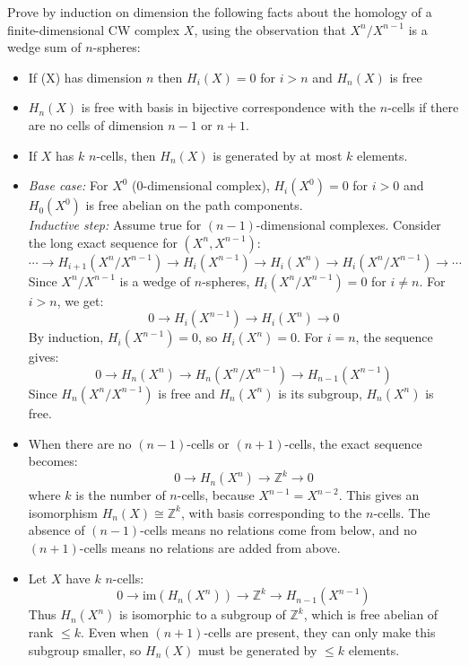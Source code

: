 \documentclass[12pt]{article}
\begin{document}
\begin{statement}
    Prove by induction on dimension the following facts about the homology of a finite-dimensional CW complex $X$, using the observation that $X^n/X^{n-1}$ is a wedge sum of $n$-spheres:
    \begin{itemize}
        \item If (X) has dimension $n$ then $H_i(X)=0$ for $i > n$ and $H_n(X)$ is free 
        \item $H_n(X)$ is free with basis in bijective correspondence with the $n$-cells if there are no cells of dimension $n-1$ or $n+1$.
        \item If $X$ has $k$ $n$-cells, then $H_n(X)$ is generated by at most $k$ elements.
    \end{itemize}
\end{statement}
\begin{newproof}
    \begin{itemize}
        \item \textit{Base case:} For $X^0$ (0-dimensional complex), $H_i(X^0) = 0$ for $i > 0$ and $H_0(X^0)$ is free abelian on the path        components. \\
        \textit{Inductive step:} Assume true for $(n-1)$-dimensional complexes. Consider the long exact sequence for $(X^n, X^{n-1})$:
            $$\cdots \to H_{i+1}(X^n/X^{n-1}) \to H_i(X^{n-1}) \to H_i(X^n) \to H_i(X^n/X^{n-1}) \to \cdots$$
            Since $X^n/X^{n-1}$ is a wedge of $n$-spheres, $H_i(X^n/X^{n-1}) = 0$ for $i \neq n$. For $i > n$, we get:
            $$0 \to H_i(X^{n-1}) \to H_i(X^n) \to 0$$
            By induction, $H_i(X^{n-1}) = 0$, so $H_i(X^n) = 0$. For $i = n$, the sequence gives:
            $$0 \to H_n(X^n) \to H_n(X^n/X^{n-1}) \to H_{n-1}(X^{n-1})$$
            Since $H_n(X^n/X^{n-1})$ is free and $H_n(X^n)$ is its subgroup, $H_n(X^n)$ is free.
            
        \item When there are no $(n-1)$-cells or $(n+1)$-cells, the exact sequence becomes:
            $$0 \to H_n(X^n) \to \mathbb{Z}^k \to 0$$
            where $k$ is the number of $n$-cells, because $X^{n-1}=X^{n-2}$. This gives an isomorphism $H_n(X) \cong \mathbb{Z}^k$, with basis corresponding to the $n$-cells. The absence of $(n-1)$-cells means no relations come from below, and no $(n+1)$-cells means no relations are added from above.

        \item Let $X$ have $k$ $n$-cells:
            $$0 \to \text{im}(H_n(X^n)) \to \mathbb{Z}^k \to H_{n-1}(X^{n-1})$$
            Thus $H_n(X^n)$ is isomorphic to a subgroup of $\mathbb{Z}^k$, which is free abelian of rank $\leq k$. Even when $(n+1)$-cells are present, they can only make this subgroup smaller, so $H_n(X)$ must be generated by $\leq k$ elements.
    \end{itemize}
\end{newproof}
\end{document}
